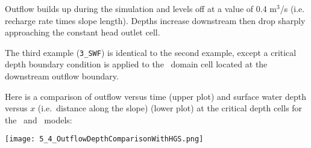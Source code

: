 Outflow builds up during the simulation and levels off at a value of 0.4 m$^{3}$/s (i.e. recharge rate times slope length).   Depths increase downstream then drop sharply approaching the constant head outlet cell.

\pagebreak
The third example (\texttt{3\_SWF}) is identical to the second example, except a critical depth boundary condition is applied to the \swf\ domain cell located at the downstream outflow boundary.

Here is a comparison of outflow versus time (upper plot) and surface water depth versus $x$ (i.e.\ distance along the slope) (lower plot) at the critical depth cells for the \mfus\ and \hgs\ models:

\texttt{[image: 5\_4\_OutflowDepthComparisonWithHGS.png]}



